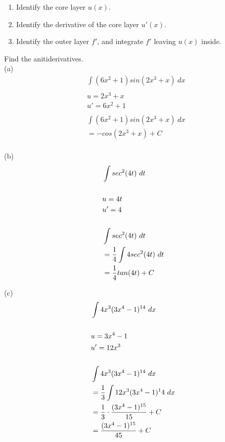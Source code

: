 \begin{enumerate}
    \item
          Identify the core layer $ u(x) $.

    \item
          Identify the derivative of the core layer $ u'(x) $.

    \item
          Identify the outer layer $ f' $, and integrate $ f' $ leaving $ u(x) $ inside.
\end{enumerate}

\begin{exercise}\nonumber
    Find the anitiderivatives. \\

    (a)
    \begin{align}
         & \int (6x^2 + 1)sin(2x^3 + x) \ dx \\
        \\
         & u = 2x^3 + x                      \\
         & u' = 6x^2 + 1                     \\
        \\
         & \int (6x^2 + 1)sin(2x^3 + x) \ dx \\
         & = -cos(2x^3 + x) + C              \\
    \end{align}

    (b)
    \begin{align}
         & \int sec^2(4t) \ dt                \\
        \\
         & u = 4t                             \\
         & u' = 4                             \\
        \\
         & \int sec^2(4t) \ dt                \\
         & = {1 \over 4} \int 4sec^2(4t) \ dt \\
         & = {1 \over 4}tan(4t) + C           \\
    \end{align}

    (c)
    \begin{align}
         & \int 4x^3(3x^4 - 1)^{14} \ dx                      \\
        \\
         & u = 3x^4 - 1                                       \\
         & u' = 12x^3                                         \\
        \\
         & \int 4x^3(3x^4 - 1)^{14} \ dx                      \\
         & = {1 \over 3} \int 12x^3(3x^4 - 1)^14 \ dx         \\
         & = {1 \over 3} \cdot {(3x^4 - 1)^{15} \over 15} + C \\
         & = {(3x^4 - 1)^{15} \over 45} + C                   \\
    \end{align}


\end{exercise}

